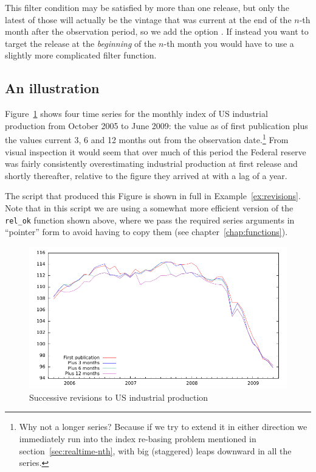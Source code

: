 This filter condition may be satisfied by more than one release, but
only the latest of those will actually be the vintage that was current
at the end of the $n$-th month after the observation period, so we add
the option
.
If instead you want to target the release at the \emph{beginning} of
the $n$-th month you would have to use a slightly more complicated
filter function.

\subsection{An illustration}

Figure~\ref{fig:realtime-lag} shows four time series for the monthly
index of US industrial production from October 2005 to June 2009: the
value as of first publication plus the values current 3, 6 and 12
months out from the observation date.\footnote{Why not a longer
  series? Because if we try to extend it in either direction we
  immediately run into the index re-basing problem mentioned in
  section~\ref{sec:realtime-nth}, with big (staggered) leaps downward
  in all the series.} From visual inspection it would seem that over
much of this period the Federal reserve was fairly consistently
overestimating industrial production at first release and shortly
thereafter, relative to the figure they arrived at with a lag of a
year.

The script that produced this Figure is shown in full in
Example~\ref{ex:revisions}. Note that in this script we are using a
somewhat more efficient version of the \verb|rel_ok| function shown
above, where we pass the required series arguments in ``pointer'' form
to avoid having to copy them (see chapter~\ref{chap:functions}).

\begin{figure}[htbp]
  \centering
\includegraphics{figures/realtime}
  \caption{Successive revisions to US industrial production}
  \label{fig:realtime-lag}
\end{figure}

